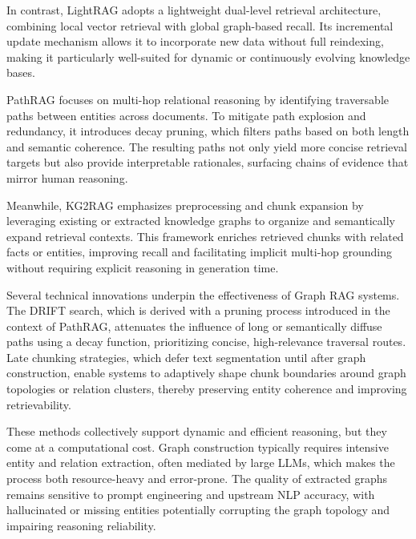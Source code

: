 \documentclass[12pt,twoside]{report}
\begin{document}
In contrast, LightRAG \cite{LightRAG} adopts a lightweight dual-level retrieval architecture, combining local vector retrieval with global graph-based recall. Its incremental update mechanism allows it to incorporate new data without full reindexing, making it particularly well-suited for dynamic or continuously evolving knowledge bases.

PathRAG \cite{PathRAG} focuses on multi-hop relational reasoning by identifying traversable paths between entities across documents. To mitigate path explosion and redundancy, it introduces decay pruning, which filters paths based on both length and semantic coherence. The resulting paths not only yield more concise retrieval targets but also provide interpretable rationales, surfacing chains of evidence that mirror human reasoning.

Meanwhile, KG2RAG \cite{KG2RAG} emphasizes preprocessing and chunk expansion by leveraging existing or extracted knowledge graphs to organize and semantically expand retrieval contexts. This framework enriches retrieved chunks with related facts or entities, improving recall and facilitating implicit multi-hop grounding without requiring explicit reasoning in generation time.

Several technical innovations underpin the effectiveness of Graph RAG systems. The DRIFT search\cite{DRIFTSearch}, which is derived with a pruning process introduced in the context of PathRAG\cite{PathRAG}, attenuates the influence of long or semantically diffuse paths using a decay function, prioritizing concise, high-relevance traversal routes. Late chunking strategies, which defer text segmentation until after graph construction, enable systems to adaptively shape chunk boundaries around graph topologies or relation clusters, thereby preserving entity coherence and improving retrievability.

These methods collectively support dynamic and efficient reasoning, but they come at a computational cost. Graph construction typically requires intensive entity and relation extraction, often mediated by large LLMs, which makes the process both resource-heavy and error-prone. The quality of extracted graphs remains sensitive to prompt engineering and upstream NLP accuracy, with hallucinated or missing entities potentially corrupting the graph topology and impairing reasoning reliability.
\end{document}
